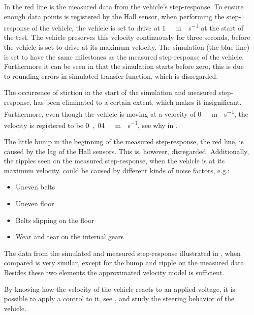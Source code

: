 %
In  the red line is the measured data from the vehicle's step-response. To ensure enough data points is registered by the Hall sensor, when performing the step-response of the vehicle, the vehicle is set to drive at \si{1\ m\cdot s^{-1}} at the start of the test. The vehicle preserves this velocity continuously for three seconds, before the vehicle is set to drive at its maximum velocity. The simulation (the blue line) is set to have the same milestones as the measured step-response of the vehicle. Furthermore it can be seen in  that the simulation starts before zero, this is due to rounding errors in simulated transfer-function, which is disregarded.

The occurrence of stiction in the start of the simulation and measured step-response, has been eliminated to a certain extent, which makes it insignificant. Furthermore, even though the vehicle is moving at a velocity of \si{0\ m \cdot s^{-1}}, the velocity is registered to be \si{0,04\ m \cdot s^{-1}}, see why in . 

The little bump in the beginning of the measured step-response, the red line, is caused by the lag of the Hall sensors. This is, however, disregarded. Additionally, the ripples seen on the measured step-response, when the vehicle is at its maximum velocity, could be caused by different kinds of noise factors, e.g.:

\begin{itemize}
\item Uneven belts
\item Uneven floor
\item Belts slipping on the floor
\item Wear and tear on the internal gears
\end{itemize}

The data from the simulated and measured step-response illustrated in , when compared is very similar, except for the bump and ripple on the measured data. Besides these two elements the approximated velocity model is sufficient.

By knowing how the velocity of the vehicle reacts to an applied voltage, it is possible to apply a control to it, see , and study the steering behavior of the vehicle.